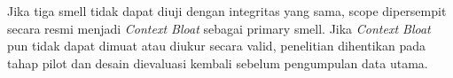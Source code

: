 Jika tiga smell tidak dapat diuji dengan integritas yang sama, scope dipersempit secara resmi menjadi \textit{Context Bloat} sebagai primary smell. Jika \textit{Context Bloat} pun tidak dapat dimuat atau diukur secara valid, penelitian dihentikan pada tahap pilot dan desain dievaluasi kembali sebelum pengumpulan data utama.
